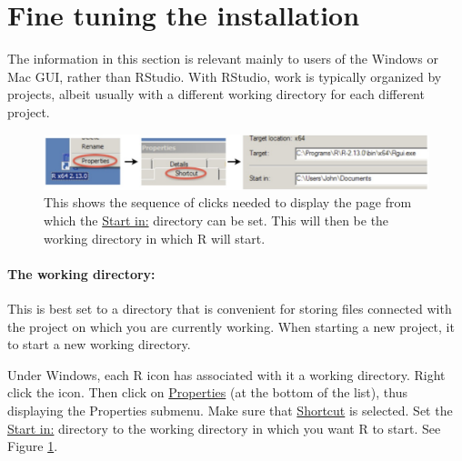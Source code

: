 






\section{Fine tuning the installation}\label{sec:fine-tune}
The information in this section is relevant mainly to users of the Windows
or Mac GUI, rather than RStudio.  With RStudio, work is typically
organized by projects, albeit usually with a different working
directory for each different project.

\begin{figure}
\includegraphics{figs-inc/16i-gui-prop.jpg}
\caption{This shows the sequence of clicks needed to display the
page from which the \underline{Start in:} directory can be set. This
will then be the working directory in which R will start.\label{fig:startin}}
\end{figure}

\paragraph{The working directory:}  This is best set to a directory that is
convenient for storing files connected with the project on which you are
currently working.  When starting a new project, it to start
a new working directory.

Under Windows, each R icon has associated with it a working directory.
  Right click the icon.  Then click on
\underline{Properties} (at the bottom of the list), thus displaying
the Properties submenu.  Make sure that \underline{Shortcut} is
selected.  Set the \underline{Start in:} directory to the working
directory in which you want R to start.  See Figure \ref{fig:startin}.

